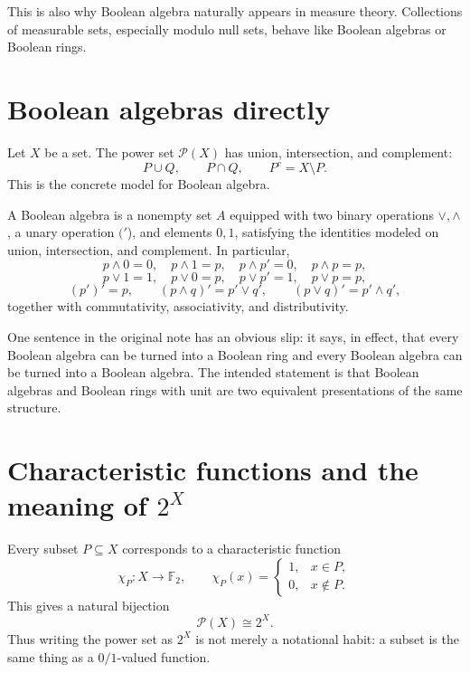 \begin{remark}
This is also why Boolean algebra naturally appears in measure theory.  Collections of measurable sets, especially modulo null sets, behave like Boolean algebras or Boolean rings.
\end{remark}

\section{Boolean algebras directly}

Let \(X\) be a set.  The power set \(\mathcal P(X)\) has union, intersection, and complement:
\[
  P\cup Q,\qquad P\cap Q,\qquad P^c=X\setminus P.
\]
This is the concrete model for Boolean algebra.

\begin{definition}
A Boolean algebra is a nonempty set \(A\) equipped with two binary operations \(\vee,\wedge\), a unary operation \(('\)), and elements \(0,1\), satisfying the identities modeled on union, intersection, and complement.  In particular,
\[
  p\wedge0=0,\quad p\wedge1=p,\quad p\wedge p'=0,\quad p\wedge p=p,
\]
\[
  p\vee1=1,\quad p\vee0=p,\quad p\vee p'=1,\quad p\vee p=p,
\]
\[
  (p')'=p,\qquad
  (p\wedge q)'=p'\vee q',\qquad
  (p\vee q)'=p'\wedge q',
\]
together with commutativity, associativity, and distributivity.
\end{definition}

\begin{caution}
One sentence in the original note has an obvious slip: it says, in effect, that every Boolean algebra can be turned into a Boolean ring and every Boolean algebra can be turned into a Boolean algebra.  The intended statement is that Boolean algebras and Boolean rings with unit are two equivalent presentations of the same structure.
\end{caution}

\section[Characteristic functions and the meaning of 2\textasciicircum{}X]{Characteristic functions and the meaning of \(2^X\)}

Every subset \(P\subseteq X\) corresponds to a characteristic function
\[
  \chi_P:X\to\mathbb F_2,\qquad
  \chi_P(x)=
  \begin{cases}
    1,&x\in P,\\
    0,&x\notin P.
  \end{cases}
\]
This gives a natural bijection
\[
  \mathcal P(X)\cong 2^X.
\]
Thus writing the power set as \(2^X\) is not merely a notational habit: a subset is the same thing as a \(0/1\)-valued function.

